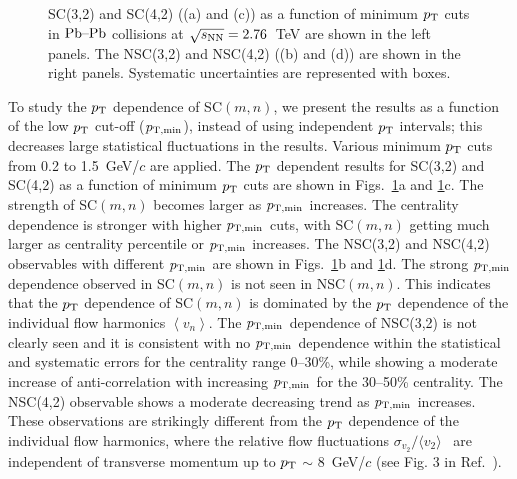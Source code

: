 \begin{figure}[t!]
	\begin{center}
        \caption{SC(3,2) and SC(4,2) ((a) and (c)) as a function of minimum $p_{\rm T}$ cuts in $\textnormal{Pb--Pb}$ collisions at $\sqrt{s_{\textnormal{NN}}}=2.76$~TeV are shown in the left panels. The NSC(3,2) and NSC(4,2) ((b) and (d)) are shown in the right panels. Systematic uncertainties are represented with boxes.}         \label{fig:Figure_2}
        \end{center}   
\end{figure}

To study the $p_{\rm T}$ dependence of SC$(m,n)$, we present the results as a function of the low $p_{\rm T}$ cut-off ($p_{\rm T, min}$), instead of using independent $p_{\rm T}$ intervals; this decreases large statistical fluctuations in the results. Various minimum $p_{\rm T}$ cuts from 0.2 to 1.5~GeV/$c$ are applied.
The $p_{\rm T}$ dependent results for SC(3,2) and SC(4,2) as a function of minimum $p_{\rm T}$ cuts are shown in Figs.~\ref{fig:Figure_2}a and \ref{fig:Figure_2}c.
The strength of SC$(m,n)$ becomes larger as $p_{\rm T, min}$ increases. 
The centrality dependence is stronger with higher $p_{\rm T, min}$ cuts, with SC$(m,n)$ getting much larger as centrality percentile or $p_{\rm T, min}$ increases. 
The NSC(3,2) and NSC(4,2) observables with different $p_{\rm T, min}$ are shown in Figs.~\ref{fig:Figure_2}b and \ref{fig:Figure_2}d.
The strong $p_{\rm T, min}$ dependence observed in SC$(m,n)$ is not seen in NSC$(m,n)$. 
This indicates that the $p_{\rm T}$ dependence of SC$(m,n)$ is dominated by the $p_{\rm T}$  dependence of the individual flow harmonics $\left<v_n\right>$. 
The $p_{\rm T, min}$ dependence of NSC(3,2) is not clearly seen and it is consistent with no $p_{\rm T, min}$ dependence within the statistical and systematic errors for the centrality range 0--30\%, while showing a moderate increase of anti-correlation with increasing $p_{\rm T, min}$ for the 30--50\% centrality.
The NSC(4,2) observable shows a moderate decreasing trend as $p_{\rm T, min}$ increases. These observations are strikingly different from the $p_{\rm T}$ dependence of the individual flow harmonics, where the relative flow fluctuations $\sigma_{v_2}/\langle v_{2} \rangle$~\cite{Voloshin:2008dg} are independent of transverse momentum up to $p_{\rm T}$ $\sim$ 8~GeV/$c$ (see Fig. 3 in Ref.~\cite{Abelev:2012di}).

